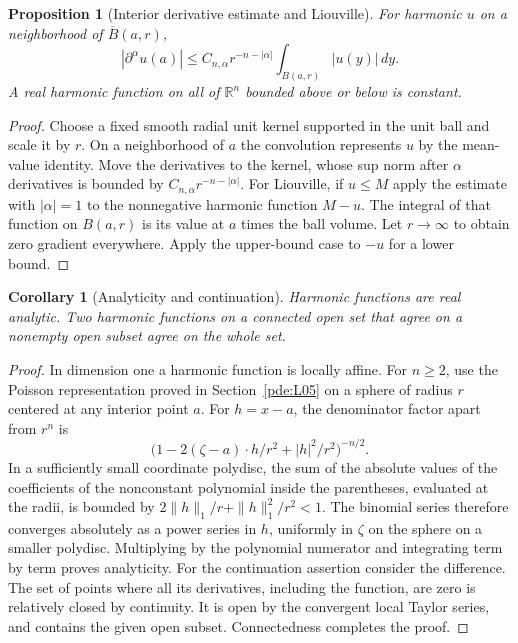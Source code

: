 \documentclass[11pt,oneside,openany]{book}
\theoremstyle{plain}
\newtheorem{proposition}[theorem]{Proposition}
\newtheorem{corollary}[theorem]{Corollary}
\theoremstyle{definition}
\theoremstyle{remark}
\begin{document}
\begin{proposition}[Interior derivative estimate and Liouville]
\label{prop:pde-harmonic-derivatives}
For harmonic \(u\) on a neighborhood of \(\overline B(a,r)\),
\[
 |\partial^\alpha u(a)|
 \le C_{n,\alpha}r^{-n-|\alpha|}
                      \int_{B(a,r)}|u(y)|\,dy .
\]
A real harmonic function on all of \(\mathbb R^n\) bounded
above or below is constant.
\end{proposition}
\begin{proof}
Choose a fixed smooth radial unit kernel supported in the unit
ball and scale it by \(r\). On a neighborhood of \(a\) the
convolution represents \(u\) by the mean-value identity.
Move the derivatives to the kernel, whose sup norm after
\(\alpha\) derivatives is bounded by
\(C_{n,\alpha}r^{-n-|\alpha|}\).
For Liouville, if \(u\le M\) apply the estimate with
\(|\alpha|=1\) to the nonnegative harmonic function \(M-u\).
The integral of that function on \(B(a,r)\) is its value at
\(a\) times the ball volume. Let \(r\to\infty\) to obtain
zero gradient everywhere. Apply the upper-bound case to \(-u\)
for a lower bound.
\end{proof}

\begin{corollary}[Analyticity and continuation]
\label{cor:pde-harmonic-analytic}
Harmonic functions are real analytic. Two harmonic functions
on a connected open set that agree on a nonempty open subset
agree on the whole set.
\end{corollary}
\begin{proof}
In dimension one a harmonic function is locally affine.
For \(n\ge2\), use the Poisson representation proved in
Section~\ref{pde:L05} on a sphere of radius \(r\) centered
at any interior point \(a\). For \(h=x-a\), the denominator
factor apart from \(r^n\) is
\[
 \bigl(1-2(\zeta-a)\cdot h/r^2+|h|^2/r^2\bigr)^{-n/2}.
\]
In a sufficiently small coordinate polydisc, the sum of the
absolute values of the coefficients of the nonconstant
polynomial inside the parentheses, evaluated at the radii,
is bounded by \(2\|h\|_1/r+\|h\|_1^2/r^2<1\).
The binomial series therefore converges absolutely as a
power series in \(h\), uniformly in \(\zeta\) on the sphere
on a smaller polydisc. Multiplying by the polynomial
numerator and integrating term by term proves analyticity.
For the continuation assertion consider the difference. The
set of points where all its derivatives, including the function,
are zero is relatively closed by continuity. It is open by
the convergent local Taylor series, and contains the given open
subset. Connectedness completes the proof.
\end{proof}
\end{document}
